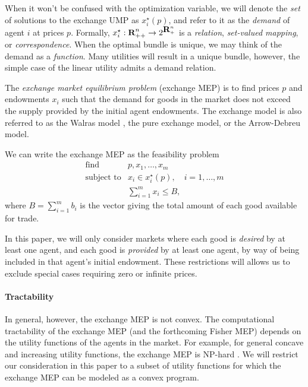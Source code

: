 \documentclass[12pt]{article}
\begin{document}
When it won't be confused with the optimization variable, we will denote the
\emph{set} of solutions to the exchange UMP as $x^\star_i(p)$, and refer to it
as the \emph{demand} of agent $i$ at prices $p$.
Formally, $x_i^\star : {\mbox{\bf R}}^n_{++} \to 2^{{\mbox{\bf R}}^n_+}$ is a \emph{relation},
\emph{set-valued mapping}, or \emph{correspondence}. When the optimal bundle is
unique, we may think of the demand as a \emph{function}.
Many utilities will result in a unique bundle, however, the simple 
case of the linear utility admits a demand relation.

The \emph{exchange market equilibrium problem} (exchange MEP) is to find prices
$p$ and endowments $x_i$ such that the demand for goods in the market does not
exceed the supply provided by the initial agent endowments. The exchange model
is also referred to as the Walras model \cite{walras1896elements}, the pure
exchange model, or the Arrow-Debreu model.

We can write the exchange MEP as the feasibility problem
\begin{equation}
\label{p-mep}
\begin{array}{ll}
\mbox{find} & p, x_1, \ldots, x_m \\
\mbox{subject to} & x_i \in x_i^\star(p),\quad i = 1,\ldots, m \\
& \sum_{i=1}^m x_i \leq B,
\end{array}
\end{equation}
where $B = \sum_{i=1}^m b_i$ is the vector giving the total amount of each good
available for trade.

In this paper, we will only consider markets where each good is \emph{desired}
by at least one agent, and each good is \emph{provided} by at least one agent,
by way of being included in that agent's initial endowment. These restrictions
will allows us to exclude special cases requiring zero or infinite prices.


\paragraph{Tractability}

In general, however, the exchange MEP is not convex. The computational
tractability of the exchange MEP (and the forthcoming Fisher MEP) depends on
the utility functions of the agents in the market. For example, for general
concave and increasing utility functions, the exchange MEP is NP-hard
\cite{codenotti2006leontief}. We will restrict our consideration in this paper
to a subset of utility functions for which the exchange MEP can be modeled as a
convex program.
\end{document}
